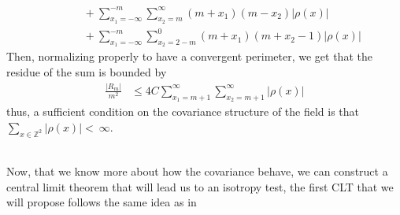 \documentclass[12pt]{article}
\theoremstyle{Theorem}
\begin{document}
{\begin{align*}
& \hspace{1cm}+ \sum_{x_1 = -\infty}^{-m} \sum_{x_2=m}^{\infty}\left(m+x_1\right)\left(m-x_2\right)|\rho(x)|\\
& \hspace{1cm}+ \sum_{x_1 = -\infty}^{-m} \sum_{x_2=2-m}^{\scriptscriptstyle 0}\left(m+x_1\right)\left(m+x_2-1\right)|\rho(x)|
\end{align*}
Then, normalizing properly to have a convergent perimeter, we get that the residue of the sum is bounded by  
\begin{align*}
\frac{|R_{m}|}{m^2} & \leq 4C\sum_{x_{\scriptscriptstyle 1} = m+1}^{\infty}\sum_{x_{\scriptscriptstyle 2}= m+1}^{\infty}|\rho(x)| 
\end{align*}
thus, a sufficient condition on the covariance structure of the field is that~$\sum_{x \in \mathbb{Z}^{2}} |\rho(x)| <~\infty$.

~\\
Now, that we know more about how the covariance behave, we can construct a central limit theorem that will lead us to an isotropy test, the first CLT that we will propose follows the same idea as in \cite{Psymetrie}
\vspace{-0.5cm}{}
}
\end{document}
